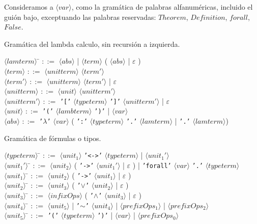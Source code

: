 \documentclass[a4paper,11pt]{article}
\begin{document}
Consideramos a $\langle var \rangle$, como la gramática de palabras alfanuméricas, incluido el guión bajo, exceptuando
las palabras reservadas: $Theorem$, $Definition$, $forall$, $False$.

Gramática del lambda calculo, sin recursión a izquierda.

\begin{tabbing}
$\langle lamterm \rangle$ \= $::=$ $\langle abs \rangle$ | $\langle term \rangle$ ( $\langle abs \rangle$ | $\varepsilon$ ) \\

$\langle term \rangle$ \> $::=$ $\langle unitterm \rangle$ $\langle term' \rangle$ \\

$\langle term' \rangle$ \> $::=$  $\langle unitterm \rangle$  $\langle term' \rangle$ | $\varepsilon$ \\

$\langle unitterm \rangle$ \> $::=$ $\langle unit \rangle$ $\langle unitterm' \rangle$ \\

$\langle unitterm' \rangle$ \> $::=$ \texttt{'['} $\langle typeterm \rangle$ \texttt{']'} $\langle unitterm' \rangle$ | $\varepsilon$ \\

$\langle unit \rangle$ \> $::=$ \texttt{'('} $\langle lambterm \rangle$ \texttt{')'} | $\langle var \rangle$ \\

$\langle abs \rangle$ \> $::=$ \texttt{'$\lambda$'} $\langle var \rangle$ ( \texttt{':'} $\langle typeterm \rangle$ \texttt{'.'} $\langle lamterm \rangle$
| \texttt{'.'} $\langle lamterm \rangle$)
\end{tabbing}

Gramática de fórmulas o tipos.

\begin{tabbing}
$\langle typeterm \rangle$ \= $::=$ $\langle unit_{1} \rangle$ \texttt{'<->'} $\langle typeterm \rangle$ | $\langle unit_{1}' \rangle$\\
$\langle unit_{1}' \rangle$ \= $::=$ $\langle unit_{2} \rangle$ ( \texttt{'->'} $\langle unit_{1}' \rangle$ | $\varepsilon$ ) 
| \texttt{'forall'} $\langle var \rangle$ \texttt{'.'} $\langle typeterm \rangle$\\
$\langle unit_{1} \rangle$ \= $::=$ $\langle unit_{2} \rangle$ ( \texttt{'->'} $\langle unit_{1} \rangle$ | $\varepsilon$ ) \\
$\langle unit_{2} \rangle$ \= $::=$ $\langle unit_{3} \rangle$ ( \texttt{'$\vee$'} $\langle unit_{2} \rangle$ | $\varepsilon$ ) \\
$\langle unit_{3} \rangle$ \= $::=$ $\langle infixOps \rangle$ ( \texttt{'$\wedge$'} $\langle unit_{3} \rangle$ | $\varepsilon$ ) \\
$\langle unit_{4} \rangle$ \= $::=$ $\langle unit_{5} \rangle$ | \texttt{'$\sim$'} $\langle unit_{4} \rangle$ |
$\langle prefixOps_{1} \rangle$ | $\langle prefixOps_{2} \rangle$ \\
$\langle unit_{5} \rangle$ \= $::=$ \texttt{'('} $\langle typeterm \rangle$ \texttt{')'} | $\langle var \rangle$ | 
$\langle prefixOps_{0} \rangle$

\end{tabbing}
\end{document}
